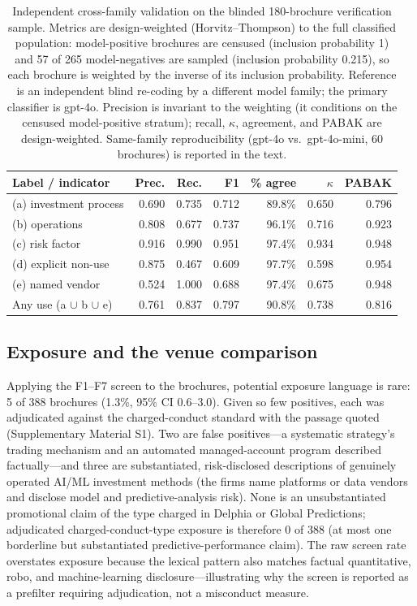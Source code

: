 \documentclass[utf8]{FrontiersinHarvard} %
\begin{document}
\begin{table}[!ht]
\caption{Independent cross-family validation on the blinded 180-brochure verification sample. Metrics are design-weighted (Horvitz--Thompson) to the full classified population: model-positive brochures are censused (inclusion probability 1) and 57 of 265 model-negatives are sampled (inclusion probability 0.215), so each brochure is weighted by the inverse of its inclusion probability. Reference is an independent blind re-coding by a different model family; the primary classifier is gpt-4o. Precision is invariant to the weighting (it conditions on the censused model-positive stratum); recall, $\kappa$, agreement, and PABAK are design-weighted. Same-family reproducibility (gpt-4o vs.\ gpt-4o-mini, 60 brochures) is reported in the text.}
\label{tab:validation}
\centering
\small
\begin{tabular}{lrrrrrr}
\toprule
Label / indicator & Prec. & Rec. & F1 & \% agree & $\kappa$ & PABAK \\
\midrule
(a) investment process & 0.690 & 0.735 & 0.712 & 89.8\% & 0.650 & 0.796 \\
(b) operations & 0.808 & 0.677 & 0.737 & 96.1\% & 0.716 & 0.923 \\
(c) risk factor & 0.916 & 0.990 & 0.951 & 97.4\% & 0.934 & 0.948 \\
(d) explicit non-use & 0.875 & 0.467 & 0.609 & 97.7\% & 0.598 & 0.954 \\
(e) named vendor & 0.524 & 1.000 & 0.688 & 97.4\% & 0.675 & 0.948 \\
Any use (a $\cup$ b $\cup$ e) & 0.761 & 0.837 & 0.797 & 90.8\% & 0.738 & 0.816 \\
\bottomrule
\end{tabular}
\end{table}

\subsection{Exposure and the venue comparison}
Applying the F1--F7 screen to the brochures, potential exposure language is rare: 5 of 388 brochures (1.3\%, 95\% CI 0.6--3.0). Given so few positives, each was adjudicated against the charged-conduct standard with the passage quoted (Supplementary Material S1). Two are false positives---a systematic strategy's trading mechanism and an automated managed-account program described factually---and three are substantiated, risk-disclosed descriptions of genuinely operated AI/ML investment methods (the firms name platforms or data vendors and disclose model and predictive-analysis risk). None is an unsubstantiated promotional claim of the type charged in Delphia or Global Predictions; adjudicated charged-conduct-type exposure is therefore 0 of 388 (at most one borderline but substantiated predictive-performance claim). The raw screen rate overstates exposure because the lexical pattern also matches factual quantitative, robo, and machine-learning disclosure---illustrating why the screen is reported as a prefilter requiring adjudication, not a misconduct measure.
\end{document}
